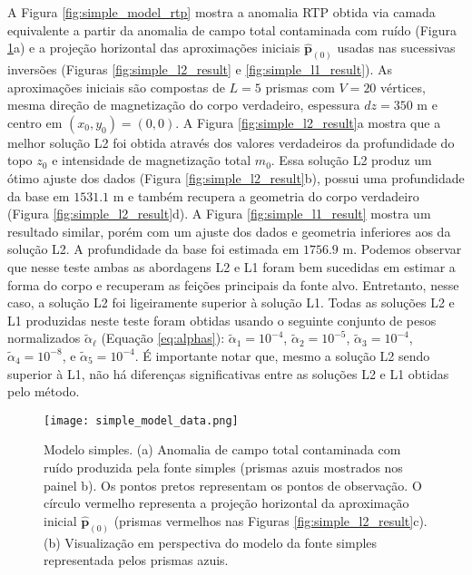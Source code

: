 A Figura \ref{fig:simple_model_rtp} mostra a anomalia RTP obtida via camada equivalente a partir da anomalia de campo total contaminada com ruído (Figura \ref{fig:simple_model}a) e 
a projeção horizontal das aproximações iniciais $\hat{\mathbf{p}}_{(0)}$ 
usadas nas sucessivas inversões (Figuras \ref{fig:simple_l2_result} e 
\ref{fig:simple_l1_result}).
As aproximações iniciais são compostas de $ L= 5$ prismas com $ V = 20 $ vértices, mesma direção de magnetização do corpo verdadeiro, espessura $ dz=350 $ m e centro em $ (x_0, y_0) = (0, 0) $.
A Figura \ref{fig:simple_l2_result}a mostra que a melhor solução L2 foi obtida através dos valores verdadeiros da profundidade do topo $z_{0}$ e intensidade de magnetização total $m_{0}$. Essa solução L2 produz um ótimo ajuste dos dados (Figura \ref{fig:simple_l2_result}b), possui uma profundidade da base em $1531.1$ m e também recupera a geometria do corpo verdadeiro (Figura \ref{fig:simple_l2_result}d).
A Figura \ref{fig:simple_l1_result} mostra um resultado similar, porém com um ajuste dos dados e geometria inferiores aos da solução L2. A profundidade da base foi estimada em $1756.9$ m.
Podemos observar que nesse teste ambas as abordagens L2 e L1 foram bem sucedidas em estimar a forma do corpo e recuperam as feições principais da fonte alvo. Entretanto, nesse caso, a solução L2 foi ligeiramente superior à solução L1.
Todas as soluções L2 e L1 produzidas neste teste foram obtidas usando o seguinte conjunto de pesos normalizados $\tilde{\alpha}_{\ell}$ (Equação \ref{eq:alphas}): 
$\tilde{\alpha}_{1} = 10^{-4}$, $\tilde{\alpha}_{2} = 10^{-5}$, 
$\tilde{\alpha}_{3} = 10^{-4}$, $\tilde{\alpha}_{4} = 10^{-8}$, e 
$\tilde{\alpha}_{5} = 10^{-4}$. 
É importante notar que, mesmo a solução L2 sendo superior à L1, não há diferenças significativas entre as soluções L2 e L1 obtidas pelo método.

\begin{figure}[!htb]
	\centering
	\texttt{[image: simple\_model\_data.png]}
	\caption{Modelo simples. (a) Anomalia de campo total contaminada com ruído produzida pela fonte simples (prismas azuis mostrados nos painel b). Os pontos pretos representam os pontos de observação. O círculo vermelho representa a projeção horizontal da aproximação inicial $\hat{\mathbf{p}}_{(0)}$ (prismas vermelhos nas Figuras
		\ref{fig:simple_l2_result}c). %
		(b) Visualização em perspectiva do modelo da fonte simples representada pelos prismas azuis.
	}
	\label{fig:simple_model}
\end{figure}

